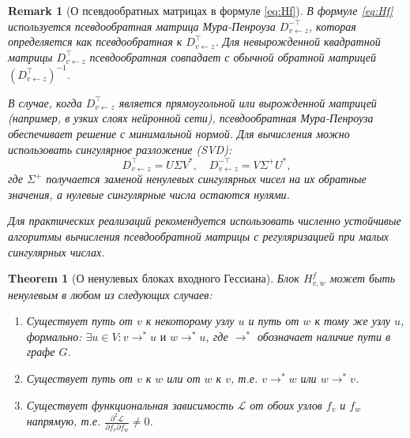 \documentclass[11pt]{article}
\newtheorem{theorem}{Theorem}
\newtheorem{remark}{Remark}
\begin{document}
\begin{remark}[О псевдообратных матрицах в формуле \eqref{eq:Hf}]
  В формуле \eqref{eq:Hf} используется псевдообратная матрица Мура-Пенроуза $D_{v\gets z}^{-\top}$, которая
  определяется как псевдообратная к $D_{v\gets z}^{\top}$. Для невырожденной квадратной матрицы $D_{v\gets
  z}^{\top}$ псевдообратная совпадает с обычной обратной матрицей $(D_{v\gets z}^{\top})^{-1}$.

  В случае, когда $D_{v\gets z}^{\top}$ является прямоугольной или вырожденной матрицей (например, в узких
  слоях нейронной сети), псевдообратная Мура-Пенроуза обеспечивает решение с минимальной нормой. Для
  вычисления можно использовать сингулярное разложение (SVD):
  \[
    D_{v\gets z}^{\top} = U\Sigma V^*, \quad D_{v\gets z}^{-\top} = V\Sigma^+ U^*,
  \]
  где $\Sigma^+$ получается заменой ненулевых сингулярных чисел на их обратные значения, а нулевые
  сингулярные числа остаются нулями.

  Для практических реализаций рекомендуется использовать численно устойчивые алгоритмы вычисления
  псевдообратной матрицы с регуляризацией при малых сингулярных числах.
\end{remark}

\begin{theorem}[О ненулевых блоках входного Гессиана]
  Блок $H^f_{v,w}$ может быть ненулевым в любом из следующих случаев:
  \begin{enumerate}
    \item Существует путь от $v$ к некоторому узлу $u$ и путь от $w$ к тому же узлу $u$, формально: $\exists u \in V: v
      \rightarrow^* u \text{ и } w \rightarrow^* u$, где $\rightarrow^*$ обозначает наличие пути в графе $G$.
    \item Существует путь от $v$ к $w$ или от $w$ к $v$, т.е. $v \rightarrow^* w$ или $w \rightarrow^* v$.
    \item Существует функциональная зависимость $\mathcal{L}$ от обоих узлов $f_v$ и $f_w$ напрямую, т.е.
      $\frac{\partial^2 \mathcal{L}}{\partial f_v \partial f_w} \neq 0$.
  \end{enumerate}
\end{theorem}
\end{document}
